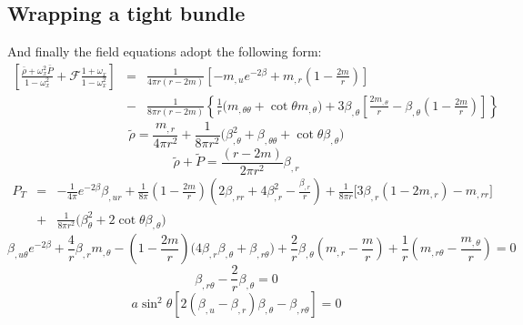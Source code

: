 \documentclass[twocolumn,superscriptaddress]{revtex4}
\begin{document}
\begin{widetext}
\subsection{Wrapping a tight bundle}
%
And finally the field equations adopt the following form:
\begin{eqnarray}
\left[\frac{\bar\rho+\omega_x^2 \bar P}{1-\omega_x^2}+  \mathcal{F}\frac{1+\omega_x}{1-\omega_x^2} \right]&=&\frac{1}{4\pi r (r-2m)}\left[-m_{,u} e^{-2\beta} + m_{,r}\left(1-\frac{2m}{r}\right)\right]\nonumber\\
&-&\frac{1}{8\pi r(r-2m)}\left\{\frac{1}{r}\bigg(m_{,\theta\theta}+\cot\theta m_{,\theta}\bigg) + 3\beta_{,\theta}\left[\frac{2m_{,\theta}}{r}-\beta_{,\theta}\left(1-\frac{2m}{r}\right)\right]\right\}
\end{eqnarray}
\begin{equation}
\tilde \rho = \frac{m_{,r}}{4\pi r^2} + \frac{1}{8\pi r^2}\bigg(\beta_{,\theta}^2+\beta_{,\theta\theta}+\cot\theta\beta_{,\theta}\bigg) \label{fe2}
\end{equation}
\begin{equation}
\tilde\rho+\tilde P=\frac{(r-2m)}{2\pi r^2}\beta_{,r} \label{fe3}
\end{equation}
\begin{eqnarray}
P_T&=&-\frac{1}{4\pi}e^{-2\beta}\beta_{,ur} + \frac{1}{8\pi}\left(1-\frac{2m}{r}\right)\left(2\beta_{,rr}+4\beta_{,r}^2-\frac{\beta_{,r}}{r}\right)+\frac{1}{8\pi r}\bigg[3\beta_{,r}(1-2m_{,r})-m_{,rr}\bigg]\nonumber\\
&+&\frac{1}{8\pi r^2}\bigg(\beta_{\theta}^2+2\cot\theta\beta_{,\theta}\bigg)
\end{eqnarray}
\begin{equation}
\beta_{,u\theta}e^{-2\beta}+\frac{4}{r}\beta_{,r}m_{,\theta}-\left(1-\frac{2m}{r}\right)\bigg(4\beta_{,r}\beta_{,\theta}+\beta_{,r\theta}\bigg)+\frac{2}{r}\beta_{,\theta}\left(m_{,r}-\frac{m}{r}\right)+\frac{1}{r}\left(m_{,r\theta}-\frac{m_{,\theta}}{r}\right)=0\label{utheta}
\end{equation}
\begin{equation}
\beta_{,r\theta}-\frac{2}{r}\beta_{,\theta}=0 \label{rtheta}
\end{equation}
\begin{equation}
a\sin^2\theta[2(\beta_{,u}-\beta_{,r})\beta_{,\theta}-\beta_{,r\theta}]=0
\end{equation}
\begin{eqnarray}

\end{eqnarray}
\end{widetext}
\end{document}
